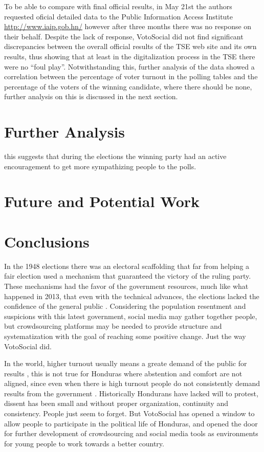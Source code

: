 \documentclass[a4paper,10pt]{article}
\begin{document}
To be able to compare with final official results, in May 21st the authors requested oficial detailed data to the Public Information Access Institute \url{http://www.iaip.gob.hn/} however after three months there was no response on their behalf. Despite the lack of response, VotoSocial did not find significant discrepancies between the overall official results of the TSE web site and its own results, thus showing that at least in the digitalization process in the TSE there were no ``foul play''. Notwithstanding this, further analysis of the data showed a correlation between the percentage of voter turnout in the polling tables and the percentage of the voters of the winning candidate, where there should be none, further analysis on this is discussed in the next section.




\section{Further Analysis}
this suggests that during the elections the winning party had an active encouragement to get more sympathizing people to the polls.
\section{Future and Potential Work}

\section{Conclusions}


In the 1948 elections there was an electoral scaffolding that far from helping a fair election used a mechanism that guaranteed the victory of the ruling party. These mechanisms had the favor of the government resources, much like what happened in 2013, that even with the technical advances, the elections lacked the confidence of the general public \citep{romero2014}. Considering the population resentment and suspicions with this latest government, social media may gather together people, but crowdsourcing platforms may be needed to provide structure and systematization with the goal of reaching some positive change. Just the way VotoSocial did.


In the world, higher turnout usually means a greate demand of the public for results \citep{mac2003}, this is not true for Honduras where abstention and comfort are not aligned, since even when there is high turnout people do not consistently demand results from the government \citep{romero2014}. Historically Hondurans have lacked will to protest, dissent has been small and without proper organization, continuity and consistency. People just seem to forget. But VotoSocial has opened a window to allow people to participate in the political life of Honduras, and opened the door for further development of crowdsourcing and social media tools as environments for young people to work towards a better country.


\newpage




\end{document}
